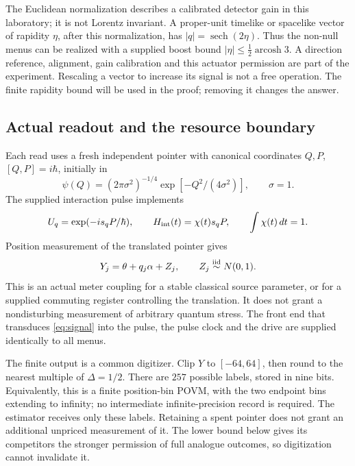 \documentclass[12pt,a4paper]{article}
\theoremstyle{definition}
\begin{document}
The Euclidean normalization describes a calibrated detector gain in this
laboratory; it is not Lorentz invariant. A proper-unit timelike or
spacelike vector of rapidity $\eta$, after this normalization, has
$|q|=\operatorname{sech}(2\eta)$. Thus the non-null menus can be realized
with a supplied boost bound
$|\eta|\leq\tfrac12\operatorname{arcosh}3$. A direction reference,
alignment, gain calibration and this actuator permission are part of the
experiment. Rescaling a vector to increase its signal is not a free
operation. The finite rapidity bound will be used in the proof; removing
it changes the answer.

\subsection{Actual readout and the resource boundary}

Each read uses a fresh independent pointer with canonical coordinates
$Q,P$, $[Q,P]=i\hbar$, initially in
\begin{equation}
 \psi(Q)=(2\pi\sigma^2)^{-1/4}
           \exp[-Q^2/(4\sigma^2)],\qquad \sigma=1.
\end{equation}
The supplied interaction pulse implements
\begin{equation}
 U_q=\exp(-i s_q P/\hbar),\qquad
 H_{\rm int}(t)=\chi(t)s_qP,\qquad\int\chi(t)\,dt=1.
 \label{eq:gate}
\end{equation}
Position measurement of the translated pointer gives
\begin{equation}
 Y_j=\theta+q_j\alpha+Z_j,\qquad Z_j\stackrel{\rm iid}{\sim}N(0,1).
 \label{eq:law}
\end{equation}
This is an actual meter coupling for a stable classical source parameter,
or for a supplied commuting register controlling the translation. It does
not grant a nondisturbing measurement of arbitrary quantum stress. The
front end that transduces \eqref{eq:signal} into the pulse, the pulse clock
and the drive are supplied identically to all menus.

The finite output is a common digitizer. Clip $Y$ to $[-64,64]$, then round
to the nearest multiple of $\Delta=1/2$. There are $257$ possible labels,
stored in nine bits. Equivalently, this is a finite position-bin POVM,
with the two endpoint bins extending to infinity; no intermediate
infinite-precision record is required. The estimator receives only these
labels. Retaining a spent pointer does not grant an additional unpriced
measurement of it. The lower bound below gives its competitors the
stronger permission of full analogue outcomes, so digitization cannot
invalidate it.
\end{document}
